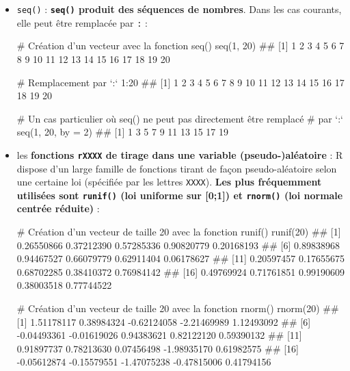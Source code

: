 \documentclass[12pt,twosided, notitlepage]{book}
\newenvironment{Shaded}{}{}
\newcommand{\CommentTok}[1]{\textcolor[rgb]{0.00,0.50,0.00}{#1}}
\newcommand{\DataTypeTok}[1]{#1}
\newcommand{\DecValTok}[1]{#1}
\newcommand{\KeywordTok}[1]{\textcolor[rgb]{0.00,0.00,1.00}{#1}}
\newcommand{\NormalTok}[1]{#1}
\newcommand{\OperatorTok}[1]{#1}
\renewenvironment{Shaded}{\begin{snugshade}}{\end{snugshade}}
\begin{document}
\begin{itemize}
\item
  \texttt{seq()} : \textbf{\texttt{seq()}
  produit des séquences de nombres}. Dans les cas courants, elle peut
  être remplacée par \texttt{:} :

\begin{Shaded}
\begin{Highlighting}[]
\CommentTok{# Création d'un vecteur avec la fonction seq()}
\KeywordTok{seq}\NormalTok{(}\DecValTok{1}\NormalTok{, }\DecValTok{20}\NormalTok{)}
\NormalTok{  ##  [1]  1  2  3  4  5  6  7  8  9 10 11 12 13 14 15 16 17 18 19 20}

\CommentTok{# Remplacement par `:`}
\DecValTok{1}\OperatorTok{:}\DecValTok{20}
\NormalTok{  ##  [1]  1  2  3  4  5  6  7  8  9 10 11 12 13 14 15 16 17 18 19 20}

\CommentTok{# Un cas particulier où seq() ne peut pas directement être remplacé}
\CommentTok{# par `:`}
\KeywordTok{seq}\NormalTok{(}\DecValTok{1}\NormalTok{, }\DecValTok{20}\NormalTok{, }\DataTypeTok{by =} \DecValTok{2}\NormalTok{)}
\NormalTok{  ##  [1]  1  3  5  7  9 11 13 15 17 19}
\end{Highlighting}
\end{Shaded}
\item
  les \textbf{fonctions \texttt{rXXXX} de tirage dans une variable
  (pseudo-)aléatoire} : R dispose d'un large famille de fonctions tirant
  de façon pseudo-aléatoire selon une certaine loi (spécifiée par les
  lettres \texttt{XXXX}). \textbf{Les plus fréquemment utilisées sont
  \texttt{runif()} (loi uniforme sur {[}0;1{]}) et \texttt{rnorm()} (loi
  normale centrée
  réduite)} :

\begin{Shaded}
\begin{Highlighting}[]
\CommentTok{# Création d'un vecteur de taille 20 avec la fonction runif()}
\KeywordTok{runif}\NormalTok{(}\DecValTok{20}\NormalTok{)}
\NormalTok{  ##  [1] 0.26550866 0.37212390 0.57285336 0.90820779 0.20168193}
\NormalTok{  ##  [6] 0.89838968 0.94467527 0.66079779 0.62911404 0.06178627}
\NormalTok{  ## [11] 0.20597457 0.17655675 0.68702285 0.38410372 0.76984142}
\NormalTok{  ## [16] 0.49769924 0.71761851 0.99190609 0.38003518 0.77744522}

\CommentTok{# Création d'un vecteur de taille 20 avec la fonction rnorm()}
\KeywordTok{rnorm}\NormalTok{(}\DecValTok{20}\NormalTok{)}
\NormalTok{  ##  [1]  1.51178117  0.38984324 -0.62124058 -2.21469989  1.12493092}
\NormalTok{  ##  [6] -0.04493361 -0.01619026  0.94383621  0.82122120  0.59390132}
\NormalTok{  ## [11]  0.91897737  0.78213630  0.07456498 -1.98935170  0.61982575}
\NormalTok{  ## [16] -0.05612874 -0.15579551 -1.47075238 -0.47815006  0.41794156}
\end{Highlighting}
\end{Shaded}
\end{itemize}
\end{document}
